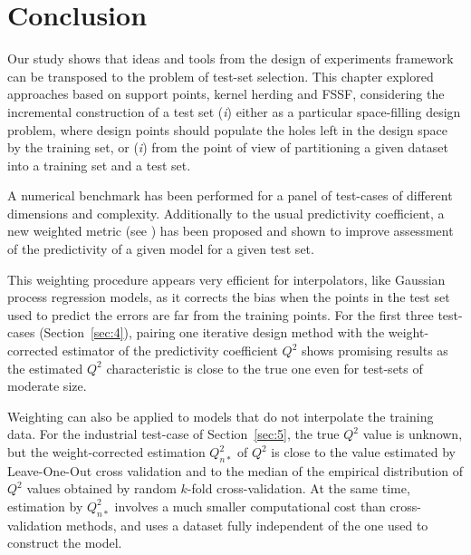 \section{Conclusion}\label{sec:val_conclusion}

Our study shows that ideas and tools from the design of experiments framework can be transposed to the problem of test-set selection. 
This chapter explored approaches based on support points, kernel herding and FSSF, considering the incremental construction of a test set (\textit{i}) either as a particular space-filling design problem, where design points should populate the holes left in the design space by the training set, or (\textit{i}) from the point of view of partitioning a given dataset into a training set and a test set. 

A numerical benchmark has been performed for a panel of test-cases of different dimensions and complexity. 
Additionally to the usual predictivity coefficient, a new weighted metric (see \cite{PR2021a}) has been proposed and shown to improve assessment of the predictivity of a given model for a given test set. 

This weighting procedure appears very efficient for interpolators, like Gaussian process regression models, as it corrects the bias when the points in the test set used to predict the errors are far from the training points. 
For the first three test-cases (Section~\ref{sec:4}), pairing one iterative design method with the weight-corrected estimator of the predictivity coefficient $Q^2$ shows promising results as the estimated $Q^2$ characteristic is close to the true one even for test-sets of moderate size. 

Weighting can also be applied to models that do not interpolate the training data. 
For the industrial test-case of Section~\ref{sec:5}, the true $Q^2$ value is unknown, but the weight-corrected estimation $Q_{n*}^2$ of $Q^2$ is close to the value estimated by Leave-One-Out cross validation and to the median of the empirical distribution of $Q^2$ values obtained by random $k$-fold cross-validation. 
At the same time, estimation by $Q_{n*}^2$ involves a much smaller computational cost than cross-validation methods, and uses a dataset fully independent of the one used to construct the model. 

